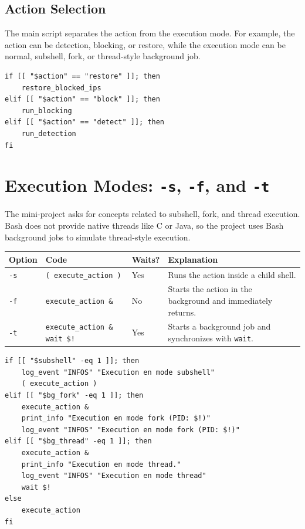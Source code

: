 \documentclass[12pt,a4paper]{article}
\begin{document}
\subsection{Action Selection}

The main script separates the action from the execution mode. For example, the action can
be detection, blocking, or restore, while the execution mode can be normal, subshell, fork,
or thread-style background job.

\begin{lstlisting}[style=bashstyle]
if [[ "$action" == "restore" ]]; then
    restore_blocked_ips
elif [[ "$action" == "block" ]]; then
    run_blocking
elif [[ "$action" == "detect" ]]; then
    run_detection
fi
\end{lstlisting}

\section{Execution Modes: \texttt{-s}, \texttt{-f}, and \texttt{-t}}

The mini-project asks for concepts related to subshell, fork, and thread execution. Bash does
not provide native threads like C or Java, so the project uses Bash background jobs to
simulate thread-style execution.

\begin{longtable}{|p{2cm}|p{4cm}|p{3cm}|p{5cm}|}
\hline
\textbf{Option} & \textbf{Code} & \textbf{Waits?} & \textbf{Explanation} \\
\hline
\texttt{-s} & \texttt{( execute\_action )} & Yes & Runs the action inside a child shell. \\
\hline
\texttt{-f} & \texttt{execute\_action \&} & No & Starts the action in the background and immediately returns. \\
\hline
\texttt{-t} & \texttt{execute\_action \& wait \$!} & Yes & Starts a background job and synchronizes with \texttt{wait}. \\
\hline
\end{longtable}

\begin{lstlisting}[style=bashstyle]
if [[ "$subshell" -eq 1 ]]; then
    log_event "INFOS" "Execution en mode subshell"
    ( execute_action )
elif [[ "$bg_fork" -eq 1 ]]; then
    execute_action &
    print_info "Execution en mode fork (PID: $!)"
    log_event "INFOS" "Execution en mode fork (PID: $!)"
elif [[ "$bg_thread" -eq 1 ]]; then
    execute_action &
    print_info "Execution en mode thread."
    log_event "INFOS" "Execution en mode thread"
    wait $!
else
    execute_action
fi
\end{lstlisting}
\end{document}
